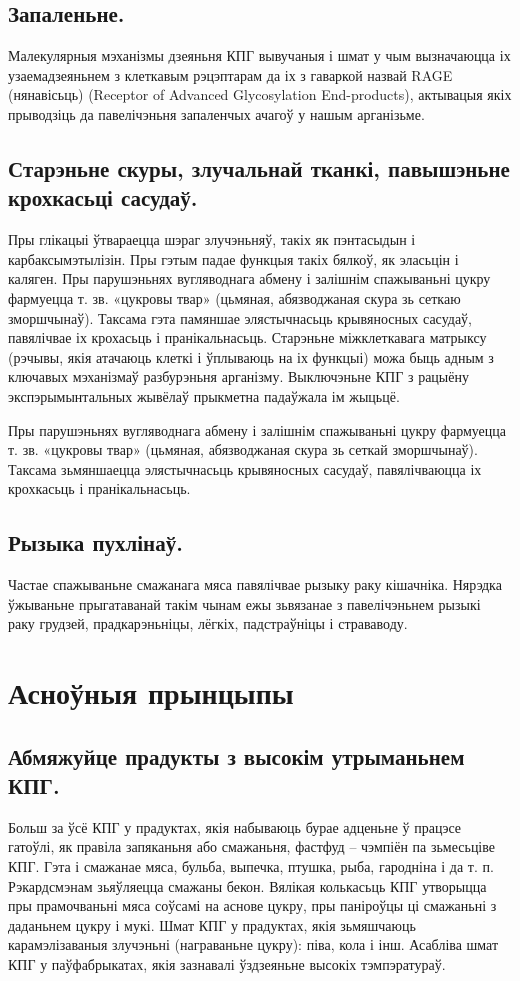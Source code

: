 \subsection{Запаленьне.}
Малекулярныя мэханізмы дзеяньня КПГ вывучаныя і шмат у чым вызначаюцца іх узаемадзеяньнем з клеткавым рэцэптарам да іх з гаваркой назвай RAGE (нянавісьць) (Receptor of Advanced Glycosylation End-products), актывацыя якіх прыводзіць да павелічэньня запаленчых ачагоў у нашым арганізьме.

\subsection{Старэньне скуры, злучальнай тканкі, павышэньне крохкасьці сасудаў.}
Пры глікацыі ўтвараецца шэраг злучэньняў, такіх як пэнтасыдын і карбаксымэтылізін. Пры гэтым падае функцыя такіх бялкоў, як эласьцін і каляген. Пры парушэньнях вугляводнага абмену і залішнім спажываньні цукру фармуецца т. зв. «цукровы твар» (цьмяная, абязводжаная скура зь сеткаю зморшчынаў). Таксама гэта памяншае элястычнасьць крывяносных сасудаў, павялічвае іх крохасьць і пранікальнасьць. Старэньне міжклеткавага матрыксу (рэчывы, якія атачаюць клеткі і ўплываюць на іх функцыі) можа быць адным з ключавых мэханізмаў разбурэньня арганізму. Выключэньне КПГ з рацыёну экспэрымынтальных жывёлаў прыкметна падаўжала ім жыцьцё.

Пры парушэньнях вугляводнага абмену і залішнім спажываньні цукру фармуецца т. зв. «цукровы твар» (цьмяная, абязводжаная скура зь сеткай зморшчынаў). Таксама зьмяншаецца элястычнасьць крывяносных сасудаў, павялічваюцца іх крохкасьць і пранікальнасьць.

\subsection{Рызыка пухлінаў.}
Частае спажываньне смажанага мяса павялічвае рызыку раку кішачніка. Нярэдка ўжываньне прыгатаванай такім чынам ежы зьвязанае з павелічэньнем рызыкі раку грудзей, прадкарэньніцы, лёгкіх, падстраўніцы і страваводу.

\section{Асноўныя прынцыпы}

\subsection{Абмяжуйце прадукты з высокім утрыманьнем КПГ.}
Больш за ўсё КПГ у прадуктах, якія набываюць бурае адценьне ў працэсе гатоўлі, як правіла запяканьня або смажаньня, фастфуд – чэмпіён па зьмесьціве КПГ. Гэта і смажанае мяса, бульба, выпечка, птушка, рыба, гародніна і да т. п. Рэкардсмэнам зьяўляецца смажаны бекон. Вялікая колькасьць КПГ утворыцца пры прамочваньні мяса соўсамі на аснове цукру, пры паніроўцы ці смажаньні з даданьнем цукру і мукі. Шмат КПГ у прадуктах, якія зьмяшчаюць карамэлізаваныя злучэньні (награваньне цукру): піва, кола і інш. Асабліва шмат КПГ у паўфабрыкатах, якія зазнавалі ўздзеяньне высокіх тэмпэратураў.

